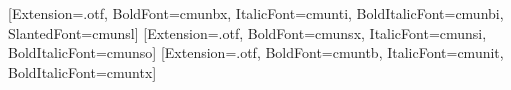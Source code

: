 \usepackage[no-math]{fontspec}
\setmainfont{cmunrm}[Extension=.otf, BoldFont=cmunbx, ItalicFont=cmunti, BoldItalicFont=cmunbi, SlantedFont=cmunsl]
\setsansfont{cmunss}[Extension=.otf, BoldFont=cmunsx, ItalicFont=cmunsi, BoldItalicFont=cmunso]
\setmonofont{cmuntt}[Extension=.otf, BoldFont=cmuntb, ItalicFont=cmunit, BoldItalicFont=cmuntx]
\usepackage[english,russian,shorthands=off]{babel}
